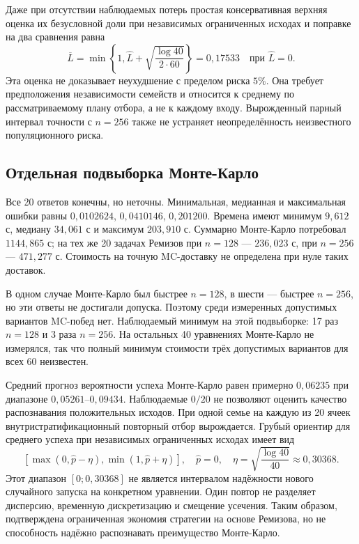 Даже при отсутствии наблюдаемых потерь простая консервативная верхняя оценка их безусловной доли при независимых ограниченных исходах и поправке на два сравнения равна
\begin{equation}
\overline L=\min\left\{1,\widehat L+\sqrt{\frac{\log40}{2\cdot60}}\right\}
=0{,}17533\quad\text{при }\widehat L=0.
\end{equation}
Эта оценка не доказывает неухудшение с пределом риска $5\%$. Она требует предположения независимости семейств и относится к среднему по рассматриваемому плану отбора, а не к каждому входу. Вырожденный парный интервал точности с $n=256$ также не устраняет неопределённость неизвестного популяционного риска.

\subsection*{Отдельная подвыборка Монте-Карло}
Все 20 ответов конечны, но неточны. Минимальная, медианная и максимальная ошибки равны $0{,}0102624$, $0{,}0410146$, $0{,}201200$. Времена имеют минимум $9{,}612$ с, медиану $34{,}061$ с и максимум $203{,}910$ с. Суммарно Монте-Карло потребовал $1144{,}865$ с; на тех же 20 задачах Ремизов при $n=128$ --- $236{,}023$ с, при $n=256$ --- $471{,}277$ с. Стоимость на точную MC-доставку не определена при нуле таких доставок.

В одном случае Монте-Карло был быстрее $n=128$, в шести --- быстрее $n=256$, но эти ответы не достигали допуска. Поэтому среди измеренных допустимых вариантов MC-побед нет. Наблюдаемый минимум на этой подвыборке: 17 раз $n=128$ и 3 раза $n=256$. На остальных 40 уравнениях Монте-Карло не измерялся, так что полный минимум стоимости трёх допустимых вариантов для всех 60 неизвестен.

Средний прогноз вероятности успеха Монте-Карло равен примерно $0{,}06235$ при диапазоне $0{,}05261$--$0{,}09434$. Наблюдаемые $0/20$ не позволяют оценить качество распознавания положительных исходов. При одной семье на каждую из 20 ячеек внутристратификационный повторный отбор вырождается. Грубый ориентир для среднего успеха при независимых ограниченных исходах имеет вид
\begin{equation}
\left[\max(0,\widehat p-\eta),\min(1,\widehat p+\eta)\right],\quad
\widehat p=0,\quad\eta=\sqrt{\frac{\log40}{40}}\approx0{,}30368.
\end{equation}
Этот диапазон $[0;0{,}30368]$ не является интервалом надёжности нового случайного запуска на конкретном уравнении. Один повтор не разделяет дисперсию, временную дискретизацию и смещение усечения. Таким образом, подтверждена ограниченная экономия стратегии на основе Ремизова, но не способность надёжно распознавать преимущество Монте-Карло.
